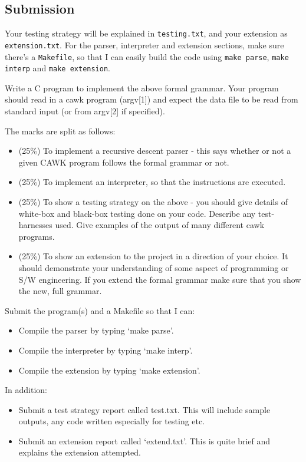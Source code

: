 \begin{exercise}
\subsection*{Submission}
Your testing strategy will be explained in \verb^testing.txt^, and your extension
as \verb^extension.txt^. For the parser, interpreter and extension sections, make
sure there's a \verb^Makefile^, so that I can easily build the code using \verb^make parse^,
\verb^make interp^ and \verb^make extension^.

\end{exercise}



\begin{exercise}
Write a C program to implement the above formal grammar. Your program
should read in a cawk program (argv[1]) and expect the data
file to be read from standard input (or from argv[2] if specified).

The marks are split as follows:
\begin{itemize}
\item (25\%) To implement a recursive descent parser - this says
whether or not a given CAWK program follows the formal grammar or not.

\item (25\%) To implement an interpreter, so that the instructions are
executed.

\item (25\%) To show a testing strategy on the above -
you should give details of
white-box and black-box testing done on your code. Describe any
test-harnesses used. Give examples of the output of many different
cawk programs.

\item (25\%) To show an extension to the project in a direction of
your choice. It should demonstrate your understanding of some aspect
of programming or S/W engineering. If you extend the formal grammar
make sure that you show the new, full grammar.
\end{itemize}

Submit the program(s) and a Makefile so that I can:

\begin{itemize}
\item Compile the parser by typing `make parse'.
\item Compile the interpreter by typing `make interp'.
\item Compile the extension by typing `make extension'.
\end{itemize}

In addition:
\begin{itemize}
\item Submit a test strategy report called test.txt. This will include
sample outputs, any code written especially for testing etc.
\item Submit an extension report called `extend.txt'. This is quite
brief and explains the extension attempted.
\end{itemize}

\end{exercise}

